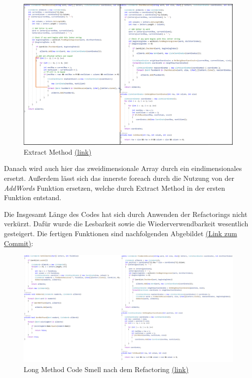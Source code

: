 \begin{figure}[!ht]
  \centering
  \includegraphics[width=\textwidth]{Bilder/ExtractMethod2.PNG}
  \caption[Extract Method]{Extract Method \href{https://github.com/EinToni/WortfinderDoku/blob/main/Bilder/ExtractMethod2.png}{(link)}}
  \label{Abb:ExtractMethod2}
\end{figure}

Danach wird auch hier das zweidimensionale Array durch ein eindimensionales ersetzt. Außerdem lässt sich das innerste foreach durch die Nutzung von der \textit{AddWords} Funktion ersetzen, welche durch Extract Method in der ersten Funktion entstand. 


Die Insgesamt Länge des Codes hat sich durch Anwenden der Refactorings nicht verkürzt. Dafür wurde die Lesbarkeit sowie die Wiederverwendbarkeit wesentlich gesteigert. Die fertigen Funktionen sind nachfolgenden Abgebildet \href{https://github.com/EinToni/Wortfinder/commit/e56ec221727039af2f0b6c06985f3b0edf8bdf3c}{(Link zum Commit)}:

\begin{figure}[!ht]
  \centering
  \includegraphics[width=\textwidth]{Bilder/endeRefactoring1.PNG}
  \caption[Long Method Code Smell nach dem Refactoring]{Long Method Code Smell nach dem Refactoring \href{https://github.com/EinToni/WortfinderDoku/blob/main/Bilder/endeRefactoring1.png}{(link)}}
  \label{Abb:endeRefactoring1}
\end{figure}

